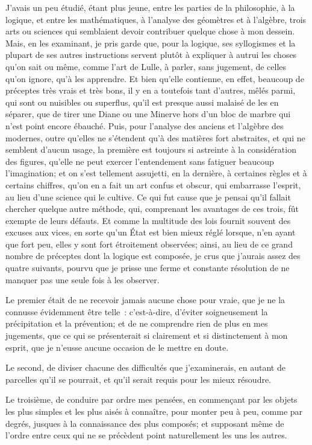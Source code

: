 \documentclass[french,twoside]{book} %
\begin{document}
J'avais un peu étudié, étant plus jeune, entre les parties de la philosophie, à la logique, et entre les mathématiques, à l'analyse des géomètres et à l'algèbre, trois arts ou sciences qui semblaient devoir contribuer quelque chose à mon dessein. Mais, en les examinant, je pris garde que, pour la logique, ses syllogismes et la plupart de ses autres instructions servent plutôt à expliquer à autrui les choses qu'on sait ou même, comme l'art de Lulle, à parler, sans jugement, de celles qu'on ignore, qu'à les apprendre. Et bien qu'elle contienne, en effet, beaucoup de préceptes très vrais et très bons, il y en a toutefois tant d'autres, mêlés parmi, qui sont ou nuisibles ou superflus, qu'il est presque aussi malaisé de les en séparer, que de tirer une Diane ou une Minerve hors d'un bloc de marbre qui n'est point encore ébauché. Puis, pour l'analyse des anciens et l'algèbre des modernes, outre qu'elles ne s'étendent qu'à des matières fort abstraites, et qui ne semblent d'aucun usage, la première est toujours si astreinte à la considération des figures, qu'elle ne peut exercer l'entendement sans fatiguer beaucoup l'imagination; et on s'est tellement assujetti, en la dernière, à certaines règles et à certains chiffres, qu'on en a fait un art confus et obscur, qui embarrasse l'esprit, au lieu d'une science qui le cultive. Ce qui fut cause que je pensai qu'il fallait chercher quelque autre méthode, qui, comprenant les avantages de ces trois, fût exempte de leurs défauts. Et comme la multitude des lois fournit souvent des excuses aux vices, en sorte qu'un État est bien mieux réglé lorsque, n'en ayant que fort peu, elles y sont fort étroitement observées; ainsi, au lieu de ce grand nombre de préceptes dont la logique est composée, je crus que j'aurais assez des quatre suivants, pourvu que je prisse une ferme et constante résolution de ne manquer pas une seule fois à les observer.\par
Le premier était de ne recevoir jamais aucune chose pour vraie, que je ne la connusse évidemment être telle : c'est-à-dire, d'éviter soigneusement la précipitation et la prévention; et de ne comprendre rien de plus en mes jugements, que ce qui se présenterait si clairement et si distinctement à mon esprit, que je n'eusse aucune occasion de le mettre en doute.\par
Le second, de diviser chacune des difficultés que j'examinerais, en autant de parcelles qu'il se pourrait, et qu'il serait requis pour les mieux résoudre.\par
Le troisième, de conduire par ordre mes pensées, en commençant par les objets les plus simples et les plus aisés à connaître, pour monter peu à peu, comme par degrés, jusques à la connaissance des plus composés; et supposant même de l'ordre entre ceux qui ne se précèdent point naturellement les uns les autres.\par
\end{document}
